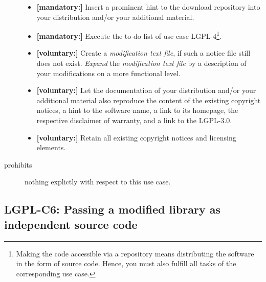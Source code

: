 \begin{description}
\begin{itemize}
  \item \textbf{[mandatory:]} Insert a prominent hint to the download repository
  into your distribution and/or your additional material.
  
  \item \textbf{[mandatory:]} Execute the to-do list of use case LGPL-4\footnote{
  Making the code accessible via a repository means distributing the software in
  the form of source code. Hence, you must also fulfill all tasks of the
  corresponding use case.}.
    
  \item \textbf{[voluntary:]} Create a \emph{modification text file}, if such a
  notice file still does not exist. \emph{Expand} the \emph{modification text
  file} by a description of your modifications on a more functional level.
  
  \item \textbf{[voluntary:]} Let the documentation of your distribution and/or
  your additional material also reproduce the content of the existing
  copyright notices, a hint to the software name, a link to its homepage,
  the respective disclaimer of warranty, and a link to the LGPL-3.0.
  
  \item \textbf{[voluntary:]} Retain all existing copyright notices and
  licensing elements. 


\end{itemize}

\item[prohibits] nothing explictly with respect to this use case.

\end{description}

\subsection{LGPL-C6: Passing a modified library as independent source code}
\label{OSUC-08S-LGPL}

